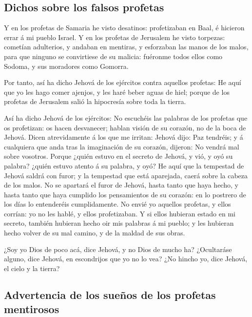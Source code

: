 \hypertarget{dichos-sobre-los-falsos-profetas}{%
\subsection{Dichos sobre los falsos
profetas}\label{dichos-sobre-los-falsos-profetas}}

 Y en los profetas de Samaria he visto desatinos:
profetizaban en Baal, é hicieron errar á mi pueblo Israel. 
Y en los profetas de Jerusalem he visto torpezas: cometían adulterios, y
andaban en mentiras, y esforzaban las manos de los malos, para que
ninguno se convirtiese de su malicia: fuéronme todos ellos como Sodoma,
y sus moradores como Gomorra.

 Por tanto, así ha dicho Jehová de los ejércitos contra
aquellos profetas: He aquí que yo les hago comer ajenjos, y les haré
beber aguas de hiel; porque de los profetas de Jerusalem salió la
hipocresía sobre toda la tierra.

 Así ha dicho Jehová de los ejércitos: No escuchéis las
palabras de los profetas que os profetizan: os hacen desvanecer; hablan
visión de su corazón, no de la boca de Jehová.  Dicen
atrevidamente á los que me irritan: Jehová dijo: Paz tendréis; y á
cualquiera que anda tras la imaginación de su corazón, dijeron: No
vendrá mal sobre vosotros.  Porque ¿quién estuvo en el
secreto de Jehová, y vió, y oyó su palabra? ¿quién estuvo atento á su
palabra, y oyó?  He aquí que la tempestad de Jehová saldrá
con furor; y la tempestad que está aparejada, caerá sobre la cabeza de
los malos.  No se apartará el furor de Jehová, hasta tanto
que haya hecho, y hasta tanto que haya cumplido los pensamientos de su
corazón: en lo postrero de los días lo entenderéis cumplidamente.
 No envié yo aquellos profetas, y ellos corrían: yo no les
hablé, y ellos profetizaban.  Y si ellos hubieran estado en
mi secreto, también hubieran hecho oir mis palabras á mi pueblo; y les
hubieran hecho volver de su mal camino, y de la maldad de sus obras.

 ¿Soy yo Dios de poco acá, dice Jehová, y no Dios de mucho
ha?  ¿Ocultaráse alguno, dice Jehová, en escondrijos que yo
no lo vea? ¿No hincho yo, dice Jehová, el cielo y la tierra?

\hypertarget{advertencia-de-los-sueuxf1os-de-los-profetas-mentirosos}{%
\subsection{Advertencia de los sueños de los profetas
mentirosos}\label{advertencia-de-los-sueuxf1os-de-los-profetas-mentirosos}}


